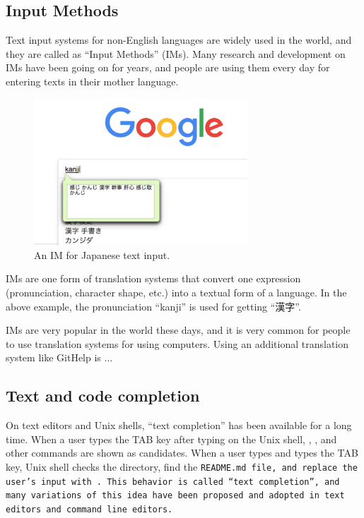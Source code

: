 \documentclass{sigchi}
\def\GH{\textsf{GitHelp}}
\begin{document}
\subsection{Input Methods}

Text input systems for non-English languages are widely used
in the world,
and they are called as ``Input Methods'' (IMs).
%
Many research and development on IMs have been going on for years, and
people are using them every day for entering texts in their mother language.

\begin{figure}[h]
  \includegraphics[width=8cm,bb=0 0 976 670]{figures/nyuuryoku-ime.png}
  \caption{An IM for Japanese text input.}
  \label{bash1}
\end{figure}

IMs are one form of translation systems that convert one
expression (pronunciation, character shape, etc.)
into a textual form of a language.
In the above example, the pronunciation ``kanji''
is used for getting ``漢字''.

IMs are very popular in the world these days,
and it is very common for people to 
use translation systems for using computers.
Using an additional translation system like {\GH} is ...

\subsection{Text and code completion}

On text editors and Unix shells,
``text completion'' has been available for a long time.
%
When a user types the TAB key after typing  on the Unix shell,
, , and other commands are shown as candidates.
When a user types  and types the TAB key,
Unix shell checks the directory, find the \tt{README.md} file, and
replace the user's input with .
This behavior is called ``text completion'', and many variations of
this idea have been proposed and adopted in text editors and command line editors.
\end{document}
